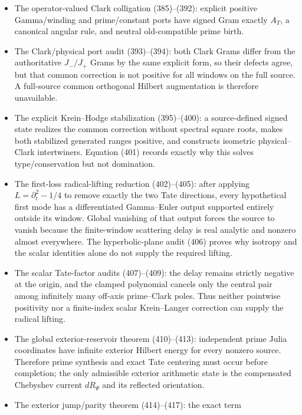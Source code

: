 \documentclass[11pt]{article}
\begin{document}
\begin{itemize}
      Krein/Hodge before taking its scalar supertrace.
\item The operator-valued Clark colligation (385)--(392): explicit positive
      Gamma/winding and prime/constant ports have signed Gram exactly $A_T$,
      a canonical angular rule, and neutral old-compatible prime birth.
\item The Clark/physical port audit (393)--(394): both Clark Grams differ
      from the authoritative $J_-/J_+$ Grams by the same explicit form, so
      their defects agree, but that common correction is not positive for
      all windows on the full source.  A full-source common orthogonal
      Hilbert augmentation is therefore unavailable.
\item The explicit Krein--Hodge stabilization (395)--(400): a
      source-defined signed state realizes the common correction without
      spectral square roots, makes both stabilized generated ranges positive,
      and constructs isometric physical--Clark intertwiners.  Equation (401)
      records exactly why this solves type/conservation but not domination.
\item The first-loss radical-lifting reduction (402)--(405): after applying
      $L=\partial_t^2-1/4$ to remove exactly the two Tate directions, every
      hypothetical first mode has a differentiated Gamma--Euler output
      supported entirely outside its window.  Global vanishing of that
      output forces the source to vanish because the finite-window
      scattering delay is real analytic and nonzero almost everywhere.
      The hyperbolic-plane audit (406) proves why isotropy and the scalar
      identities alone do not supply the required lifting.
\item The scalar Tate-factor audits (407)--(409): the delay remains strictly
      negative at the origin, and the clamped polynomial cancels only the
      central pair among infinitely many off-axis prime--Clark poles.  Thus
      neither pointwise positivity nor a finite-index scalar
      Krein--Langer correction can supply the radical lifting.
\item The global exterior-reservoir theorem (410)--(413): independent prime
      Julia coordinates have infinite exterior Hilbert energy for every
      nonzero source.  Therefore prime synthesis and exact Tate centering
      must occur before completion; the only admissible exterior arithmetic
      state is the compensated Chebyshev current $dR_\Psi$ and its reflected
      orientation.
\item The exterior jump/parity theorem (414)--(417): the exact term

\end{itemize}
\end{document}
